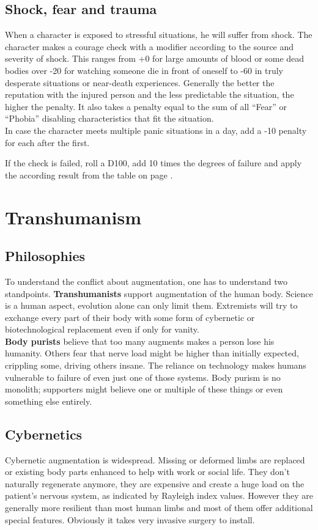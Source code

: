 \documentclass[12pt,a4paper,openany]{book}
\begin{document}
	\section{Shock, fear and trauma}
	When a character is exposed to stressful situations, he will suffer from shock. The character makes a courage check with a modifier according to the source and severity of shock. This ranges from +0 for large amounts of blood or some dead bodies over -20 for watching someone die in front of oneself to -60 in truly desperate situations or near-death experiences. Generally the better the reputation with the injured person and the less predictable the situation, the higher the penalty. It also takes a penalty equal to the sum of all “Fear” or “Phobia” disabling characteristics that fit the situation.\\
	In case the character meets multiple panic situations in a day, add a -10 penalty for each after the first.
	
	If the check is failed, roll a D100, add 10 times the degrees of failure and apply the according result from the table on page \pageref{feartable}.
	\chapter{Transhumanism}
	\section{Philosophies}
	To understand the conflict about augmentation, one has to understand two standpoints. \textbf{Transhumanists} support augmentation of the human body. Science is a human aspect, evolution alone can only limit them. Extremists will try to exchange every part of their body with some form of cybernetic or biotechnological replacement even if only for vanity.\\
	\textbf{Body purists} believe that too many augments makes a person lose his humanity. Others fear that nerve load might be higher than initially expected, crippling some, driving others insane. The reliance on technology makes humans vulnerable to failure of even just one of those systems. Body purism is no monolith; supporters might believe one or multiple of these things or even something else entirely.
	\section{Cybernetics}
	Cybernetic augmentation is widespread. Missing or deformed limbs are replaced or existing body parts enhanced to help with work or social life. They don’t naturally regenerate anymore, they are expensive and create a huge load on the patient’s nervous system, as indicated by Rayleigh index values. However they are generally more resilient than most human limbs and most of them offer additional special features. Obviously it takes very invasive surgery to install.
\end{document}
